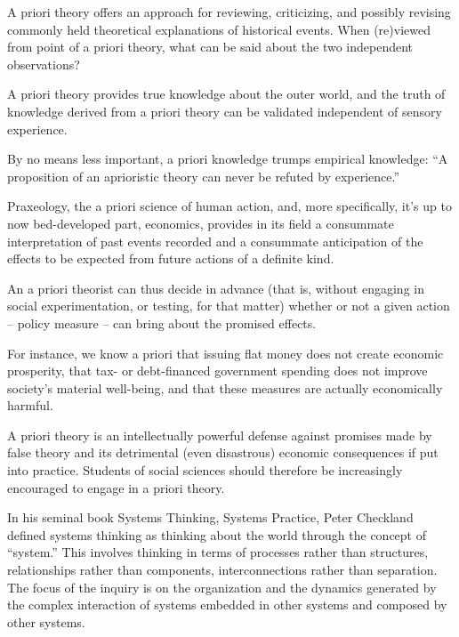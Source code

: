 A priori theory offers an approach for reviewing, criticizing, and possibly revising commonly held theoretical explanations of historical events. When (re)viewed from point of a priori theory, what can be said about the two independent observations?

A priori theory provides true knowledge about the outer world, and the truth of knowledge derived from a priori theory can be validated independent of sensory experience.

By no means less important, a priori knowledge trumps empirical knowledge: ``A proposition of an aprioristic theory can never be refuted by experience.''

Praxeology, the a priori science of human action, and, more specifically, it’s up to now bed-developed part, economics, provides in its field a consummate interpretation of past events recorded and a consummate anticipation of the effects to be expected from future actions of a definite kind.

An a priori theorist can thus decide in advance (that is, without engaging in social experimentation, or testing, for that matter) whether or not a given action – policy measure – can bring about the promised effects.

For instance, we know a priori that issuing flat money does not create economic prosperity, that tax- or debt-financed government spending does not improve society’s material well-being, and that these measures are actually economically harmful.

A priori theory is an intellectually powerful defense against promises made by false theory and its detrimental (even disastrous) economic consequences if put into practice. Students of social sciences should therefore be increasingly encouraged to engage in a priori theory.

In his seminal book Systems Thinking, Systems Practice, Peter Checkland defined systems thinking as thinking about the world through the concept of “system.”  This involves thinking in terms of processes rather than structures, relationships rather than components, interconnections rather than separation. The focus of the inquiry is on the organization and the dynamics generated by the complex interaction of systems embedded in other systems and composed by other systems.